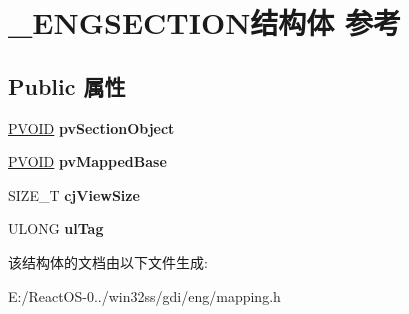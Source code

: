 \hypertarget{struct___e_n_g_s_e_c_t_i_o_n}{}\section{\+\_\+\+E\+N\+G\+S\+E\+C\+T\+I\+O\+N结构体 参考}
\label{struct___e_n_g_s_e_c_t_i_o_n}
\subsection*{Public 属性}
\begin{DoxyCompactItemize}
\item 
\mbox{\label{struct___e_n_g_s_e_c_t_i_o_n_ab915117c468730fa51b87163a8c98625}} 
\hyperlink{interfacevoid}{P\+V\+O\+ID} {\bfseries pv\+Section\+Object}
\item 
\mbox{\label{struct___e_n_g_s_e_c_t_i_o_n_ab91a356b044f491a0b1031ac66a96188}} 
\hyperlink{interfacevoid}{P\+V\+O\+ID} {\bfseries pv\+Mapped\+Base}
\item 
\mbox{\label{struct___e_n_g_s_e_c_t_i_o_n_ad79f2fe4afa10e3e6aa68353ee8d9a79}} 
S\+I\+Z\+E\+\_\+T {\bfseries cj\+View\+Size}
\item 
\mbox{\label{struct___e_n_g_s_e_c_t_i_o_n_a6bc858a0a00c3196d7ab0860a834b479}} 
U\+L\+O\+NG {\bfseries ul\+Tag}
\end{DoxyCompactItemize}


该结构体的文档由以下文件生成\+:\begin{DoxyCompactItemize}
\item 
E\+:/\+React\+O\+S-\/0../win32ss/gdi/eng/mapping.\+h\end{DoxyCompactItemize}
